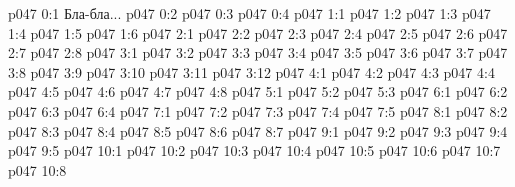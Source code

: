 \author{Яркая Вечерняя Звезда}
\vs p047 0:1  Бла-бла...
\vs p047 0:2 
\vs p047 0:3 
\vs p047 0:4 
\vs p047 1:1 
\vs p047 1:2 
\vs p047 1:3 
\vs p047 1:4 \pc 
\vs p047 1:5 
\vs p047 1:6 
\vs p047 2:1 
\vs p047 2:2 
\vs p047 2:3 
\vs p047 2:4 
\vs p047 2:5 
\vs p047 2:6 
\vs p047 2:7 
\vs p047 2:8 
\vs p047 3:1 
\vs p047 3:2 
\vs p047 3:3 
\vs p047 3:4 
\vs p047 3:5 
\vs p047 3:6 \pc 
\vs p047 3:7 \pc 
\vs p047 3:8 
\vs p047 3:9 
\vs p047 3:10 
\vs p047 3:11 \pc 
\vs p047 3:12 
\vs p047 4:1 
\vs p047 4:2 
\vs p047 4:3 
\vs p047 4:4 
\vs p047 4:5 
\vs p047 4:6 
\vs p047 4:7 
\vs p047 4:8 
\vs p047 5:1 
\vs p047 5:2 
\vs p047 5:3 
\vs p047 6:1 
\vs p047 6:2 
\vs p047 6:3 
\vs p047 6:4 
\vs p047 7:1 
\vs p047 7:2 
\vs p047 7:3 
\vs p047 7:4 
\vs p047 7:5 
\vs p047 8:1 
\vs p047 8:2 
\vs p047 8:3 \pc 
\vs p047 8:4 \pc 
\vs p047 8:5 
\vs p047 8:6 \pc 
\vs p047 8:7 
\vs p047 9:1 
\vs p047 9:2 
\vs p047 9:3 \pc 
\vs p047 9:4 
\vs p047 9:5 \pc 
{}
\vs p047 10:1 
\vs p047 10:2 \pc 
\vs p047 10:3 
\vs p047 10:4 \pc 
\vs p047 10:5 
\vs p047 10:6 \pc 
\vs p047 10:7 \pc 
\vsetoff
\vs p047 10:8 
\quizlink
